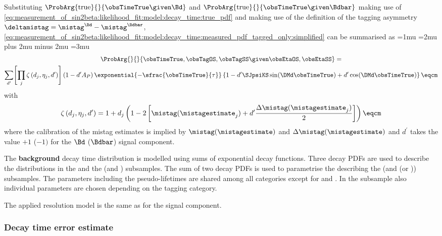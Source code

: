 %
Substituting $\ProbArg{\text{true}}{}{\obsTimeTrue \given \Bd}$ and
$\ProbArg{\text{true}}{}{\obsTimeTrue \given \Bdbar}$ making use of
\cref{eq:measurement_of_sin2beta:likelihood_fit:model:decay_time:true_pdf} and
making use of the definition of the tagging asymmetry $\deltamistag =
\mistag^{\Bd} - \mistag^{\Bdbar}$, 
\cref{eq:measurement_of_sin2beta:likelihood_fit:model:decay_time:measured_pdf_tagged_only:simplified} 
can be summarised as
%
\begingroup
  \thinmuskip=1mu
  \medmuskip=2mu plus 2mu minus 2mu
  \thickmuskip=3mu
\begin{multline}\raisetag{50pt}
  \ProbArg{}{}{\obsTimeTrue, \obsTagOS, \obsTagSS \given \obsEtaOS, \obsEtaSS} = \\
  \sum_{d^\prime} \Biggl[ \prod_{j} \zeta \left( d_j, \eta_j, d^{\prime} \right) \Biggr] \left( 1 - d^\prime A_P \right) \exponential{-\sfrac{\obsTimeTrue}{\tau}} \left\{ 1 - d^\prime \SJpsiKS \sin (\DMd \obsTimeTrue) + d^\prime \cos (\DMd \obsTimeTrue) \right\} \eqcm 
\end{multline}
\endgroup
%
with
%
\begin{equation}
  \zeta \left( d_j, \eta_j, d^{\prime} \right) = 1 + d_j \left( 1 - 2 \left[ \mistag(\mistagestimate_j) + d^{\prime} \frac{\Delta\mistag(\mistagestimate_j)}{2} \right] \right) \eqcm
\end{equation}
%
where the calibration of the mistag estimates is implied by
$\mistag(\mistagestimate)$ and $\Delta\mistag(\mistagestimate)$ and $d^\prime$
takes the value $+1$ ($-1)$ for the $\Bd$ ($\Bdbar$) signal component.

The \textbf{background} decay time distribution is modelled using sums of
exponential decay functions. Three decay \acp{PDF} are used to describe the
distributions in the \catLL and the (\catDD and \catOS) subsamples. The sum of
two decay \acp{PDF} is used to parametrise the \PDF describing the (\catDD and
(\catSS or \catBS)) subsamples. The \PDF parameters including the
pseudo-lifetimes are shared among all categories except for \catDD and \catLL.
In the \catDD subsample also individual parameters are chosen depending on the
tagging category. 

The applied resolution model is the same as for the signal component.

\subsubsection{Decay time error estimate}
\label{sec:measurement_of_sin2beta:likelihood_fit:model:decay_time_error}

